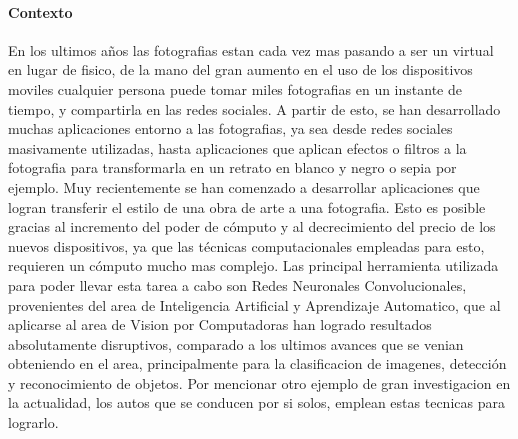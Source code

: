 \documentclass[a4paper,10pt]{article}
\begin{document}
  \paragraph{Contexto}
  En los ultimos años las fotografias estan cada vez mas pasando a ser un virtual en lugar de fisico, de la mano del gran aumento en el uso de los dispositivos moviles 
  cualquier persona puede tomar miles fotografias en un instante de tiempo, y compartirla en las redes sociales.
  A partir de esto, se han desarrollado muchas aplicaciones entorno a las fotografias, ya sea desde redes sociales masivamente utilizadas, hasta aplicaciones que aplican efectos o filtros 
  a la fotografia para transformarla en un retrato en blanco y negro o sepia por ejemplo.
  Muy recientemente se han comenzado a desarrollar aplicaciones que logran transferir el estilo de una obra de arte a una fotografia. Esto es posible gracias al incremento 
  del poder de cómputo y al decrecimiento del precio de los nuevos dispositivos, ya que las técnicas computacionales empleadas para esto, requieren un cómputo mucho mas complejo.
  Las principal herramienta utilizada para poder llevar esta tarea a cabo son Redes Neuronales Convolucionales, provenientes del area de  
  Inteligencia Artificial y Aprendizaje Automatico, que al aplicarse al area de Vision por Computadoras han logrado resultados absolutamente disruptivos, 
  comparado a los ultimos avances que se venian obteniendo en el area, principalmente para la clasificacion de imagenes, detección y reconocimiento de objetos.
  Por mencionar otro ejemplo de gran investigacion en la actualidad, los autos que se conducen por si solos, emplean estas tecnicas para lograrlo.
\end{document}
